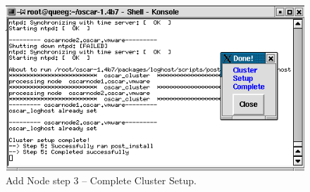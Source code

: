 \begin{figure}[h!]
  \begin{center}
    \centerline{\includegraphics[scale=\imgscale]{figs/9f_sbs-add-node-complete}}
    \caption{Add Node step 3 -- Complete Cluster Setup.}
    \label{fig:sbs-add-node1-cluster-setup}
  \end{center}
\end{figure}


